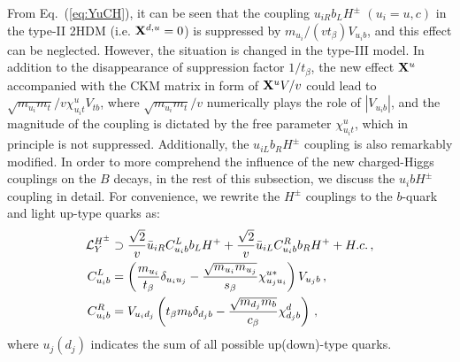 \documentclass[prd,preprint,superscriptaddress,amsmath,amssymb]{revtex4}
\begin{document}
From Eq.~(\ref{eq:YuCH}), it can be seen that the coupling $u_{iR} b_L H^\pm$ $(u_i=u,c)$ in the type-II 2HDM (i.e. ${\bf X}^{d,u}=0$) is suppressed by $m_{u_i}/ (v t_\beta) V_{u_i b}$, and  this effect  can be neglected. However, the situation is changed in the type-III model. In addition to the disappearance of suppression factor $1/t_\beta$,  the new effect ${\bf X}^u$ accompanied with the CKM matrix in form of ${\bf X}^u V/v$ could lead to $\sqrt{m_{u_i} m_t}/v \chi^u_{u_i t}V_{tb}$, where  $\sqrt{m_{u_i} m_t}/v$ numerically plays the role of $|V_{u_i b}|$, and the magnitude of the coupling is dictated by the free parameter $\chi^{u}_{u_i t}$, which in principle is not  suppressed. Additionally, the  $u_{iL} b_R H^\pm$ coupling is also  remarkably  modified.  In order to  more comprehend the influence of the new charged-Higgs couplings on the $B$ decays, in the rest of this subsection, we discuss the $u_i b H^\pm$ coupling in detail. For convenience, we rewrite the $H^\pm$ couplings to the $b$-quark and light up-type quarks as:
%  
 \begin{align}
 {\cal L}^{H^\pm}_Y &  \supset  \frac{\sqrt{2}}{v} \bar u_{i R} C^L_{u_i b} b_{L} H^+ +  \frac{\sqrt{2}}{v} \bar u_{i L} C^R_{u_i b} b_{R} H^+ + H.c.\,, \nonumber \\
 C^L_{u_i b} & =  \left(  \frac{m_{u_i}}{ t_\beta }  \delta_{u_i u_j} - \frac{\sqrt{m_{u_i} m_{u_j}}}{ s_\beta}  \chi^{u*}_{u_j u_i} \right) V_{u_j b} \,, \nonumber \\
 C^R_{u_i b} &= V_{u_i d_j} \left( t_\beta  m_b  \delta_{d_j b} - \frac{\sqrt{m_{d_j} m_{b}}}{  c_\beta} \chi^d_{d_j b}\right)\,, \label{eq:CLR}
 \end{align}
 where $u_j(d_j)$  indicates the sum of all possible up(down)-type quarks. 
\end{document}
